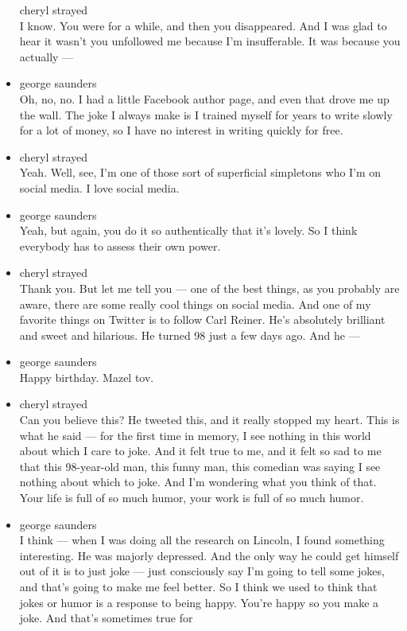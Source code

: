\begin{itemize}
  cheryl strayed\\
  I know. You were for a while, and then you disappeared. And I was glad
  to hear it wasn't you unfollowed me because I'm insufferable. It was
  because you actually ---
\item
  george saunders\\
  Oh, no, no. I had a little Facebook author page, and even that drove
  me up the wall. The joke I always make is I trained myself for years
  to write slowly for a lot of money, so I have no interest in writing
  quickly for free.
\item
  cheryl strayed\\
  Yeah. Well, see, I'm one of those sort of superficial simpletons who
  I'm on social media. I love social media.
\item
  george saunders\\
  Yeah, but again, you do it so authentically that it's lovely. So I
  think everybody has to assess their own power.
\item
  cheryl strayed\\
  Thank you. But let me tell you --- one of the best things, as you
  probably are aware, there are some really cool things on social media.
  And one of my favorite things on Twitter is to follow Carl Reiner.
  He's absolutely brilliant and sweet and hilarious. He turned 98 just a
  few days ago. And he ---
\item
  george saunders\\
  Happy birthday. Mazel tov.
\item
  cheryl strayed\\
  Can you believe this? He tweeted this, and it really stopped my heart.
  This is what he said --- for the first time in memory, I see nothing
  in this world about which I care to joke. And it felt true to me, and
  it felt so sad to me that this 98-year-old man, this funny man, this
  comedian was saying I see nothing about which to joke. And I'm
  wondering what you think of that. Your life is full of so much humor,
  your work is full of so much humor.
\item
  george saunders\\
  I think --- when I was doing all the research on Lincoln, I found
  something interesting. He was majorly depressed. And the only way he
  could get himself out of it is to just joke --- just consciously say
  I'm going to tell some jokes, and that's going to make me feel better.
  So I think we used to think that jokes or humor is a response to being
  happy. You're happy so you make a joke. And that's sometimes true for

\end{itemize}
